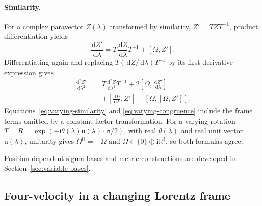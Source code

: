 \documentclass[11pt]{article}
\newcommand{\pv}[1]{{#1}}
\newcommand{\pvGreek}[1]{{#1}}
\newcommand{\vstyle}[1]{{\bm{\mathrm{#1}}}}
\newcommand{\pR}{\pv{R}}
\newcommand{\pT}{\pv{T}}
\newcommand{\pZ}{\pv{Z}}
\newcommand{\pvOmega}{\pvGreek{\Omega}}
\numberwithin{equation}{section}
\newcommand{\R}{\mathbb{R}}
\newcommand{\ii}{\mathrm{i}}
\newcommand{\dotprod}{\cdot}
\newcommand{\bsig}{\vstyle{\sigma}}
\newcommand{\bu}{\vstyle{u}}
\newcommand{\dd}{\,\mathrm d}
\begin{document}
\paragraph{Similarity.}
For a complex paravector $\pZ(\lambda)$ transformed by similarity,
$\pZ'=\pT \pZ \pT^{-1}$, product differentiation yields
\begin{equation}
 \frac{\dd \pZ'}{\dd\lambda}
 =\pT\frac{\dd \pZ}{\dd\lambda}\pT^{-1}+[\pvOmega,\pZ'].
 \label{eq:varying-similarity}
\end{equation}
Differentiating again and replacing
$\pT(\dd \pZ/\dd\lambda)\pT^{-1}$ by its first-derivative expression gives
\begin{equation*}
 \begin{aligned}
 \frac{\dd^2 \pZ'}{\dd\lambda^2}={}&\pT\frac{\dd^2\pZ}{\dd\lambda^2}\pT^{-1}
 +2\left[\pvOmega,\frac{\dd \pZ'}{\dd\lambda}\right]\\
 &+\left[\frac{\dd\pvOmega}{\dd\lambda},\pZ'\right]
 -[\pvOmega,[\pvOmega,\pZ']].
 \end{aligned}
\end{equation*}
Equations~\eqref{eq:varying-similarity} and \eqref{eq:varying-congruence}
include the frame terms omitted by a constant-factor transformation.
For a varying rotation $\pT=\pR=\exp(-\ii\theta(\lambda)\bu(\lambda)\dotprod\bsig/2)$,
with real $\theta(\lambda)$ and \hyperref[def:real-unit-vector]{real unit vector} $\bu(\lambda)$, unitarity gives
$\pvOmega^{\mathsf H}=-\pvOmega$ and $\pvOmega\in\{0\}\oplus\ii\R^3$,
so both formulas agree.

Position-dependent sigma bases and metric constructions are developed in
Section~\ref{sec:variable-bases}.

\subsection{Four-velocity in a changing Lorentz frame}
\label{sec:velocity-frame-transformations}
\end{document}
